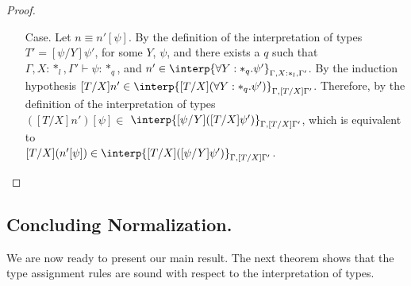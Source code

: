 \begin{proof}
\begin{itemize}
\item[Case.]  Let $n \equiv n'[\psi]$.  By the definition of the
  interpretation of types $T' = [\psi/Y]\psi'$, for some $Y$, $\psi$, and 
  there exists a $q$ such that $\Gamma,X:*_l,\Gamma' \vdash \psi:*_q$, and 
  $n' \in \interp{\forall Y:*_q.\psi'}_{\Gamma,X:*_l,\Gamma'}$.  By the 
  induction hypothesis 
  $[T/X]n' \in \interp{[T/X](\forall Y:*_q.\psi')}_{\Gamma,[T/X]\Gamma'}$.
  Therefore, by the definition of the interpretation of types\\
  $([T/X]n')[\psi] \in$
  $ \interp{[\psi/Y]([T/X]\psi')}_{\Gamma,[T/X]\Gamma'}$, which is equivalent
  to \\
  $[T/X](n'[\psi]) \in \interp{[T/X]([\psi/Y]\psi')}_{\Gamma,[T/X]\Gamma'}$.
\end{itemize}
\end{proof}

\subsection{Concluding Normalization.}
\label{subsec:soundness_of_typing_ssf}
We are now ready to present our main result.  The next theorem shows
that the type assignment rules are sound with respect to the
interpretation of types.  


